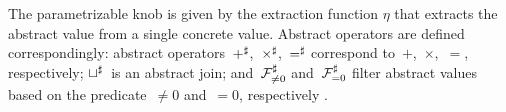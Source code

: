 \documentclass[sigplan,screen]{acmart}
\begin{document}
The parametrizable knob is given by the extraction function $\eta$ \citep{NieNieHan99Principles,DarHor19Constructive} that extracts the abstract value from a single concrete value.
Abstract operators are defined correspondingly: abstract operators~$+^\sharp$,~$\times^\sharp$,~$=^\sharp$ correspond to~$+$,~$\times$,~$=$, respectively; $\sqcup^\sharp$~is an abstract join; and~$\mathcal{F}^\sharp_{\ne 0}$ and~$\mathcal{F}^\sharp_{= 0}$ filter abstract values based on the predicate~$\ne 0$ and~$= 0$, respectively \citep{RivYi20Introduction}.
\end{document}
